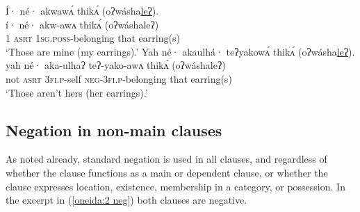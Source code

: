 \documentclass[output=paper,colorlinks,citecolor=brown]{langscibook}
\begin{document}
\ea\label{oneida:awv}
    \ea\label{oneida:awv a}
        \glll Í· né· akwawʌ́ thikʌ́ (oʔwásha\uline{leʔ}). \\
        í· né· akw-awʌ thikʌ́ (oʔwáshaleʔ) \\
        \textsc{1} \textsc{asrt} \textsc{1sg.poss}-belonging that earring(s) \\
        \glt `Those are mine (my earrings).' 
    \ex\label{oneida:awv b} 
        \glll Yah né· akaulhá· teʔyakowʌ́ thikʌ́ (oʔwásha\uline{leʔ}). \\
        yah né·  aka-ulhaʔ teʔ-yako-awʌ thikʌ́ (oʔwáshaleʔ) \\
        not \textsc{asrt} \textsc{3fi.p}-self  \textsc{neg-3fi.p}-belonging that earring(s)\\
        \glt `Those aren't hers (her earrings).' 
    \z
\z

\subsection{Negation in non-main clauses}

\label{oneida:sec:non-main}

As noted already, standard negation is used in all clauses, and regardless of whether the clause functions as a main or dependent clause, or whether the clause expresses location, existence, membership in a category, or possession. In the excerpt in (\ref{oneida:2 neg}) both clauses are negative.
\end{document}
